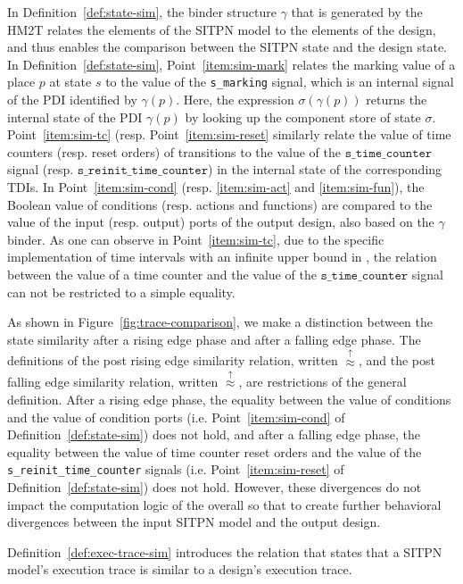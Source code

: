 \documentclass[pdflatex,sn-mathphys]{sn-jnl}%
\theoremstyle{thmstyleone}%
\theoremstyle{thmstyletwo}%
\theoremstyle{thmstylethree}%
\begin{document}
In Definition~\ref{def:state-sim}, the binder structure $\gamma$ that
is generated by the HM2T relates the elements of the SITPN model to
the elements of the \hvhdl{} design, and thus enables the comparison
between the SITPN state and the design state. In
Definition~\ref{def:state-sim}, Point~\ref{item:sim-mark} relates the
marking value of a place $p$ at state $s$ to the value of the
\texttt{s\_marking} signal, which is an internal signal of the PDI
identified by $\gamma(p)$. Here, the expression $\sigma(\gamma(p))$
returns the internal state of the PDI $\gamma(p)$ by looking up the
component store of state $\sigma$. Point~\ref{item:sim-tc} (resp.
Point~\ref{item:sim-reset} similarly relate the value of time counters
(resp. reset orders) of transitions to the value of the
$\texttt{s\_time\_counter}$ signal
(resp. $\texttt{s\_reinit\_time\_counter}$) in the internal state of
the corresponding TDIs. In Point~\ref{item:sim-cond}
(resp. \ref{item:sim-act} and \ref{item:sim-fun}), the Boolean value
of conditions (resp. actions and functions) are compared to the value
of the input (resp. output) ports of the output design, also based on
the $\gamma$ binder.  As one can observe in Point~\ref{item:sim-tc},
due to the specific implementation of time intervals with an infinite
upper bound in \hvhdl{}, the relation between the value of a time
counter and the value of the $\texttt{s\_time\_counter}$ signal can
not be restricted to a simple equality.

As shown in Figure~\ref{fig:trace-comparison}, we make a distinction
between the state similarity after a rising edge phase and after a
falling edge phase. The definitions of the post rising edge similarity
relation, written $\stackrel{\uparrow}{\approx}$, and the post falling
edge similarity relation, written $\stackrel{\uparrow}{\approx}$, are
restrictions of the general definition. After a rising edge phase, the
equality between the value of conditions and the value of condition
ports (i.e. Point~\ref{item:sim-cond} of
Definition~\ref{def:state-sim}) does not hold, and after a falling
edge phase, the equality between the value of time counter reset
orders and the value of the \texttt{s\_reinit\_time\_counter} signals
(i.e. Point~\ref{item:sim-reset} of Definition~\ref{def:state-sim})
does not hold. However, these divergences do not impact the
computation logic of the overall so that to create further behavioral
divergences between the input SITPN model and the output \hvhdl{}
design.

Definition~\ref{def:exec-trace-sim} introduces the relation that
states that a SITPN model's execution trace is similar to a \hvhdl{}
design's execution trace.
\end{document}
